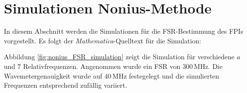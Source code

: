 \section{Simulationen Nonius-Methode}\label{anh:sec:nonius_simulationen}
In diesem Abschnitt werden die Simulationen für die FSR-Bestimmung des FPIs
vorgestellt. Es folgt der \textit{Mathematica}-Quelltext für die Simulation:
\lstset{language=Mathematica}

Abbildung \ref{fig:nonius_FSR_simulation} zeigt die Simulation für verschiedene
$a$ und $7$ Relativfrequenzen. Angenommen wurde ein FSR von $300\,$MHz. Die
Wavemetergenauigkeit wurde auf $40\,$MHz festegelegt und die simulierten
Frequenzen entsprechend zufällig variiert.
\begin{figure}[H]
 	\centering
\end{figure}
